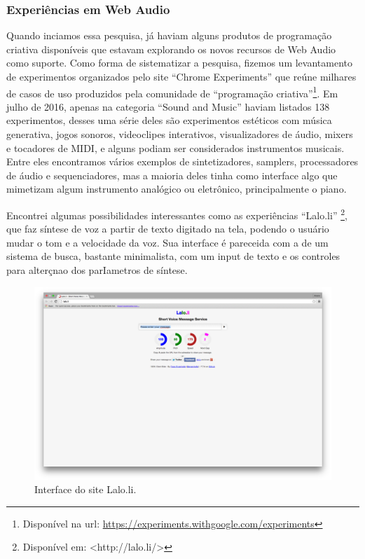 \subsubsection{Experiências em Web Audio}
Quando inciamos essa pesquisa, já haviam alguns produtos de programação criativa disponíveis que estavam explorando os novos recursos de Web Audio como suporte. Como forma de sistematizar a pesquisa, fizemos um levantamento de experimentos organizados pelo site ``Chrome Experiments'' que reúne milhares de casos de uso produzidos pela comunidade de ``programação criativa''\footnote{Disponível na url: \url{https://experiments.withgoogle.com/experiments}}. Em julho de 2016, apenas na categoria ``Sound and Music''  haviam listados 138 experimentos, desses uma série deles são experimentos estéticos com música generativa, jogos sonoros, videoclipes interativos, visualizadores de áudio, mixers e tocadores de MIDI, e alguns podiam ser considerados instrumentos musicais. Entre eles encontramos vários exemplos de sintetizadores, samplers, processadores de áudio e sequenciadores, mas a maioria deles tinha como interface algo que mimetizam algum instrumento analógico ou eletrônico, principalmente o piano.

Encontrei algumas possibilidades interessantes como as experiências ``Lalo.li'' \footnote{Disponível em: <http://lalo.li/> }, que faz síntese de voz a partir de texto digitado na tela, podendo o usuário mudar o tom e a velocidade da voz. Sua interface é pareceida com a de um sistema de busca, bastante minimalista, com um input de texto e os controles para alterçnao dos parIametros de síntese.

\begin{figure}
    \caption{\label{laloli}Interface do site Lalo.li.}
    
        \includegraphics[width=1\linewidth]{pictures/cap2/laloli}
    
\end{figure}

